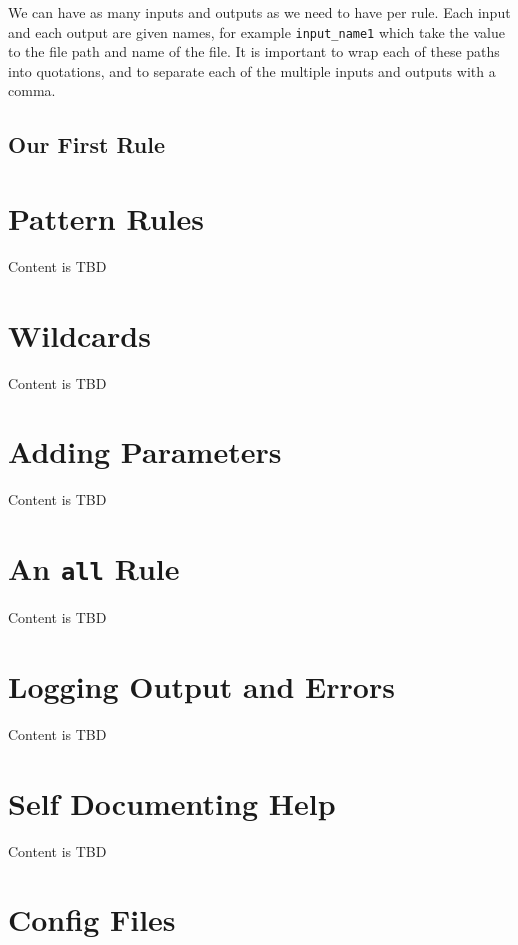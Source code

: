 \documentclass[]{book}
\theoremstyle{definition}
\theoremstyle{definition}
\theoremstyle{definition}
\theoremstyle{remark}
\begin{document}
We can have as many inputs and outputs as we need to have per rule. Each
input and each output are given names, for example \texttt{input\_name1}
which take the value to the file path and name of the file. It is
important to wrap each of these paths into quotations, and to separate
each of the multiple inputs and outputs with a comma.

\section{Our First Rule}\label{our-first-rule}

\chapter{Pattern Rules}\label{pattern-rules}

Content is TBD

\chapter{Wildcards}\label{wildcards}

Content is TBD

\chapter{Adding Parameters}\label{adding-parameters}

Content is TBD

\chapter{\texorpdfstring{An \texttt{all}
Rule}{An all Rule}}\label{an-all-rule}

Content is TBD

\chapter{Logging Output and Errors}\label{logging-output-and-errors}

Content is TBD

\chapter{Self Documenting Help}\label{self-documenting-help}

Content is TBD

\chapter{Config Files}\label{config-files}
\end{document}
